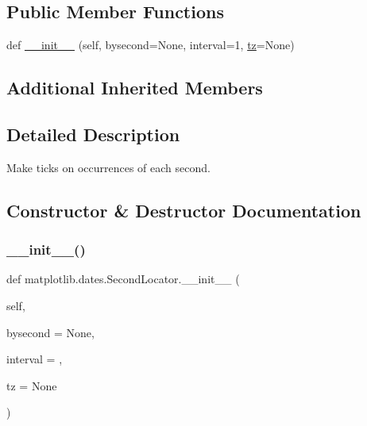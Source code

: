 \subsection*{Public Member Functions}
\begin{DoxyCompactItemize}
\item 
def \hyperlink{classmatplotlib_1_1dates_1_1SecondLocator_a2577803f31355e1cb754d347f010c449}{\+\_\+\+\_\+init\+\_\+\+\_\+} (self, bysecond=None, interval=1, \hyperlink{classmatplotlib_1_1dates_1_1DateLocator_aa18faf34dbf00ed4820535b64cd7194e}{tz}=None)
\end{DoxyCompactItemize}
\subsection*{Additional Inherited Members}


\subsection{Detailed Description}
\begin{DoxyVerb}Make ticks on occurrences of each second.
\end{DoxyVerb}
 

\subsection{Constructor \& Destructor Documentation}
\mbox{\label{classmatplotlib_1_1dates_1_1SecondLocator_a2577803f31355e1cb754d347f010c449}} 
\subsubsection{\texorpdfstring{\+\_\+\+\_\+init\+\_\+\+\_\+()}{\_\_init\_\_()}}
{\footnotesize\ttfamily def matplotlib.\+dates.\+Second\+Locator.\+\_\+\+\_\+init\+\_\+\+\_\+ (\begin{DoxyParamCaption}\item[{}]{self,  }\item[{}]{bysecond = {\ttfamily None},  }\item[{}]{interval = {},  }\item[{}]{tz = {\ttfamily None} }\end{DoxyParamCaption})}


